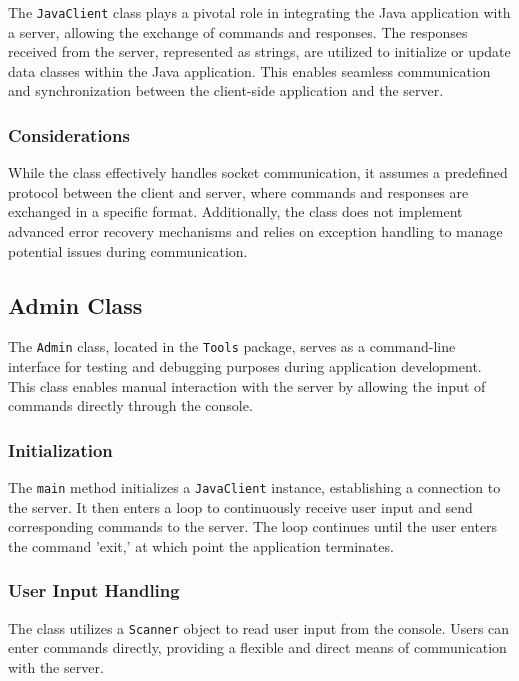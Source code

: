 \documentclass{article}
\begin{document}
The \texttt{JavaClient} class plays a pivotal role in integrating the Java application with a server, allowing the exchange of commands and responses. The responses received from the server, represented as strings, are utilized to initialize or update data classes within the Java application. This enables seamless communication and synchronization between the client-side application and the server.

\subsubsection{Considerations}

While the class effectively handles socket communication, it assumes a predefined protocol between the client and server, where commands and responses are exchanged in a specific format. Additionally, the class does not implement advanced error recovery mechanisms and relies on exception handling to manage potential issues during communication.

\subsection*{Admin Class}\label{admin}

The \texttt{Admin} class, located in the \texttt{Tools} package, serves as a command-line interface for testing and debugging purposes during application development. This class enables manual interaction with the server by allowing the input of commands directly through the console.

\subsubsection*{Initialization}

The \texttt{main} method initializes a \texttt{JavaClient} instance, establishing a connection to the server. It then enters a loop to continuously receive user input and send corresponding commands to the server. The loop continues until the user enters the command 'exit,' at which point the application terminates.

\subsubsection*{User Input Handling}

The class utilizes a \texttt{Scanner} object to read user input from the console. Users can enter commands directly, providing a flexible and direct means of communication with the server.
\end{document}
